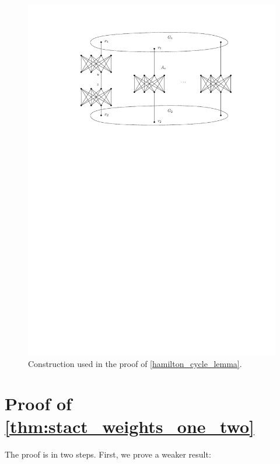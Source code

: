 \documentclass[runningheads]{llncs}
\numberwithin{equation}{section}
\begin{document}
\begin{figure}[htpb]
\centering
\includegraphics[scale=1]{img/hamilton-prime}
\caption{Construction used in the proof of \cref{hamilton_cycle_lemma}.}
\label{fig_hamilton_cycle_lemma}
\end{figure}

\section{Proof of \cref{thm:stact_weights_one_two}}
\label{appendix:proof_stact_one_two}

The proof is in two steps. First, we prove a weaker result:
\end{document}
